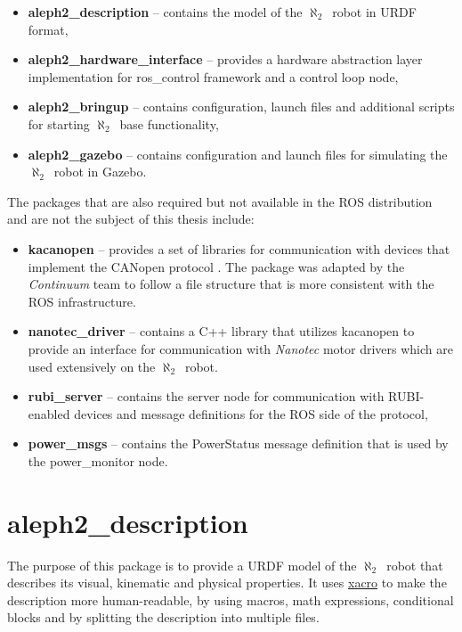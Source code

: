 \documentclass[english,inz,shortabstract]{iithesis}
\newcommand{\val}[1]{\textbf{\textsf{#1}}}
\newcommand{\rovername}{$\aleph_2$\ }
\begin{document}
	\begin{itemize}
		\item \val{aleph2\_description} -- 
		contains the model of the \rovername robot in URDF format,
		\item \val{aleph2\_hardware\_interface} -- 
		provides a hardware abstraction layer implementation for \textsf{ros\_control} framework and a control loop node,
		\item \val{aleph2\_bringup} -- 
		contains configuration, launch files and additional scripts for starting \rovername base functionality,
		\item \val{aleph2\_gazebo} -- 
		contains configuration and launch files for simulating the \rovername robot in Gazebo.
	\end{itemize}

	The packages that are also required but not available in the ROS distribution and are not the subject of this thesis include:

	\begin{itemize}
		\item \val{kacanopen} -- provides a set of libraries for communication with devices that implement the CANopen protocol \cite{kacanopen2016}. The package was adapted by the \textit{Continuum} team to follow a file structure that is more consistent with the ROS infrastructure. 
		\item \val{nanotec\_driver} -- contains a C++ library that utilizes \textsf{kacanopen} to provide an interface for communication with \textit{Nanotec} motor drivers which are used extensively on the \rovername robot.
		\item \val{rubi\_server} -- contains the server node for communication with RUBI-enabled devices and message definitions for the ROS side of the protocol,
		\item \val{power\_msgs} -- contains the \textsf{PowerStatus} message definition that is used by the \textsf{power\_monitor} node.
	\end{itemize}


\section{aleph2\_description}

	The purpose of this package is to provide a URDF model of the \rovername robot that describes its visual, kinematic and physical properties. It uses \href{http://wiki.ros.org/xacro}{\textsf{xacro}} to make the description more human-readable, by using macros, math expressions, conditional blocks and by splitting the description into multiple files. 
\end{document}
